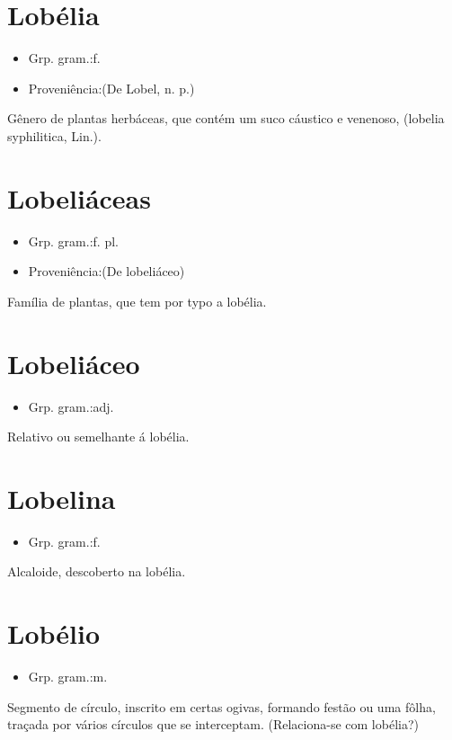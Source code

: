 \section{Lobélia}
\begin{itemize}
\item {Grp. gram.:f.}
\end{itemize}
\begin{itemize}
\item {Proveniência:(De \textunderscore Lobel\textunderscore , n. p.)}
\end{itemize}
Gênero de plantas herbáceas, que contém um suco cáustico e venenoso, (\textunderscore lobelia syphilitica\textunderscore , Lin.).
\section{Lobeliáceas}
\begin{itemize}
\item {Grp. gram.:f. pl.}
\end{itemize}
\begin{itemize}
\item {Proveniência:(De \textunderscore lobeliáceo\textunderscore )}
\end{itemize}
Família de plantas, que tem por typo a lobélia.
\section{Lobeliáceo}
\begin{itemize}
\item {Grp. gram.:adj.}
\end{itemize}
Relativo ou semelhante á lobélia.
\section{Lobelina}
\begin{itemize}
\item {Grp. gram.:f.}
\end{itemize}
Alcaloide, descoberto na lobélia.
\section{Lobélio}
\begin{itemize}
\item {Grp. gram.:m.}
\end{itemize}
Segmento de círculo, inscrito em certas ogivas, formando festão ou uma fôlha, traçada por vários círculos que se interceptam.
(Relaciona-se com \textunderscore lobélia\textunderscore ?)

